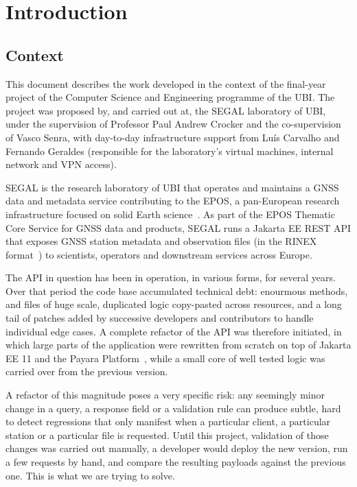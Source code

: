 \chapter{Introduction}
\label{chap:intro}

\section{Context}
\label{sec:amb}

This document describes the work developed in the context of the final-year project
of the Computer Science and Engineering programme of the \ac{UBI}. The project
was proposed by, and carried out at, the \ac{SEGAL} laboratory of \ac{UBI},
under the supervision of Professor Paul Andrew Crocker and the co-supervision
of Vasco Senra, with day-to-day infrastructure support from Luís Carvalho and
Fernando Geraldes (responsible for the laboratory's virtual machines, internal
network and \ac{VPN} access).

\ac{SEGAL} is the research laboratory of \ac{UBI} that operates and maintains
a \ac{GNSS} data and metadata service contributing to the \ac{EPOS}, a pan-European
research infrastructure focused on solid Earth science~\cite{epos,eposGnss}.
As part of the \ac{EPOS} Thematic Core Service for \ac{GNSS} data and products\cite{cocco2022epos},
\ac{SEGAL} runs a Jakarta EE \ac{REST} \ac{API} that exposes \ac{GNSS} station
metadata and observation files (in the \ac{RINEX} format~\cite{rinex}) to
scientists, operators and downstream services across Europe.

The \ac{API} in question has been in operation, in various forms, for
several years. Over that period the code base accumulated technical debt:
enourmous methods, and files of huge scale, duplicated logic copy-pasted
across resources, and a long tail of patches added by successive developers and
contributors to handle individual edge cases. A complete refactor of the
\ac{API} was therefore initiated, in which large parts of the application
were rewritten from scratch on top of Jakarta EE 11 and the Payara Platform~\cite{jakartaee,payara},
while a small core of well tested logic was carried over from the previous version.

A refactor of this magnitude poses a very specific risk: any seemingly
minor change in a query, a response field or a validation rule can produce subtle,
hard to detect regressions that only manifest when a particular client, a particular
station or a particular file is requested. Until this project, validation of
those changes was carried out manually, a developer would deploy the new
version, run a few requests by hand, and compare the resulting payloads
against the previous one. This is what we are trying to solve.

